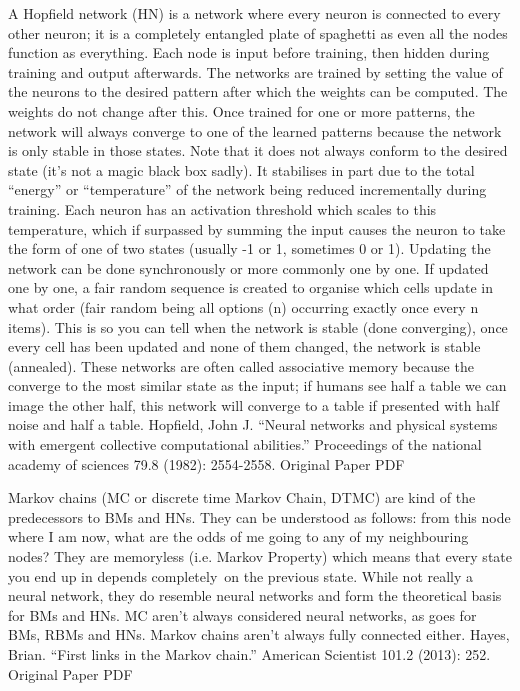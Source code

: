 \documentclass[11pt,a4paper,oneside]{ctexbook}
\begin{document}
A Hopfield network (HN) is a network where every neuron is connected to every other neuron; it is a completely entangled plate of spaghetti as even all the nodes function as everything. Each node is input before training, then hidden during training and output afterwards. The networks are trained by setting the value of the neurons to the desired pattern after which the weights can be computed. The weights do not change after this. Once trained for one or more patterns, the network will always converge to one of the learned patterns because the network is only stable in those states. Note that it does not always conform to the desired state (it’s not a magic black box sadly). It stabilises in part due to the total “energy” or “temperature” of the network being reduced incrementally during training. Each neuron has an activation threshold which scales to this temperature, which if surpassed by summing the input causes the neuron to take the form of one of two states (usually -1 or 1, sometimes 0 or 1). Updating the network can be done synchronously or more commonly one by one. If updated one by one, a fair random sequence is created to organise which cells update in what order (fair random being all options (n) occurring exactly once every n items). This is so you can tell when the network is stable (done converging), once every cell has been updated and none of them changed, the network is stable (annealed). These networks are often called associative memory because the converge to the most similar state as the input; if humans see half a table we can image the other half, this network will converge to a table if presented with half noise and half a table.
Hopfield, John J. “Neural networks and physical systems with emergent collective computational abilities.” Proceedings of the national academy of sciences 79.8 (1982): 2554-2558.
Original Paper PDF


Markov chains (MC or discrete time Markov Chain, DTMC) are kind of the predecessors to BMs and HNs. They can be understood as follows: from this node where I am now, what are the odds of me going to any of my neighbouring nodes? They are memoryless (i.e. Markov Property) which means that every state you end up in depends completely on the previous state. While not really a neural network, they do resemble neural networks and form the theoretical basis for BMs and HNs. MC aren’t always considered neural networks, as goes for BMs, RBMs and HNs. Markov chains aren’t always fully connected either.
Hayes, Brian. “First links in the Markov chain.” American Scientist 101.2 (2013): 252.
Original Paper PDF
\end{document}
